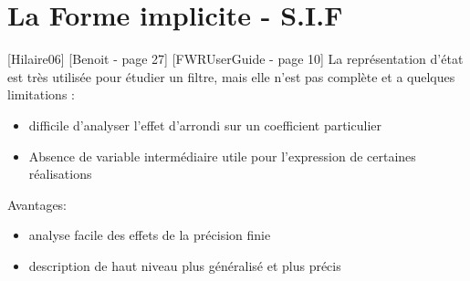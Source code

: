 \section{La Forme implicite - S.I.F}
[Hilaire06] [Benoit - page 27] [FWRUserGuide - page 10]
La représentation d'état est très utilisée pour étudier un filtre, mais elle n'est pas complète et a quelques limitations :
\begin{itemize}
\item difficile d'analyser l'effet d'arrondi sur un coefficient particulier
\item Absence de variable intermédiaire utile pour l'expression de certaines réalisations
\end{itemize}

\bigskip
Avantages:
\begin{itemize}
\item analyse facile des effets de la précision finie
\item description de haut niveau plus généralisé et plus précis
\end{itemize}



